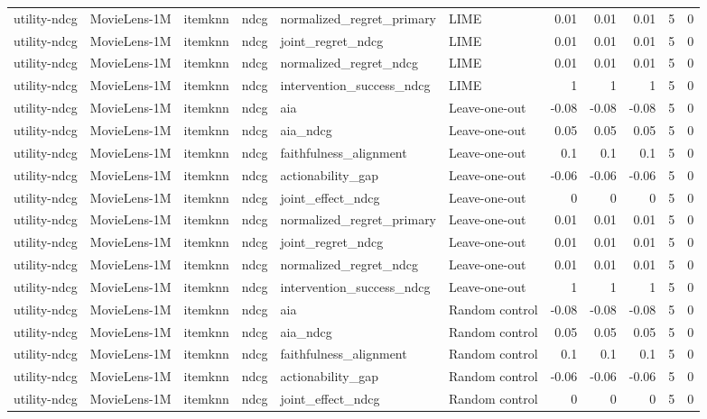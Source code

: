 \begin{table}[t]
{\begin{tabular}{llllllrrrrr}
utility-ndcg & MovieLens-1M & itemknn & ndcg & normalized\_regret\_primary & LIME & 0.01 & 0.01 & 0.01 & 5 & 0 \\
utility-ndcg & MovieLens-1M & itemknn & ndcg & joint\_regret\_ndcg & LIME & 0.01 & 0.01 & 0.01 & 5 & 0 \\
utility-ndcg & MovieLens-1M & itemknn & ndcg & normalized\_regret\_ndcg & LIME & 0.01 & 0.01 & 0.01 & 5 & 0 \\
utility-ndcg & MovieLens-1M & itemknn & ndcg & intervention\_success\_ndcg & LIME & 1 & 1 & 1 & 5 & 0 \\
utility-ndcg & MovieLens-1M & itemknn & ndcg & aia & Leave-one-out & -0.08 & -0.08 & -0.08 & 5 & 0 \\
utility-ndcg & MovieLens-1M & itemknn & ndcg & aia\_ndcg & Leave-one-out & 0.05 & 0.05 & 0.05 & 5 & 0 \\
utility-ndcg & MovieLens-1M & itemknn & ndcg & faithfulness\_alignment & Leave-one-out & 0.1 & 0.1 & 0.1 & 5 & 0 \\
utility-ndcg & MovieLens-1M & itemknn & ndcg & actionability\_gap & Leave-one-out & -0.06 & -0.06 & -0.06 & 5 & 0 \\
utility-ndcg & MovieLens-1M & itemknn & ndcg & joint\_effect\_ndcg & Leave-one-out & 0 & 0 & 0 & 5 & 0 \\
utility-ndcg & MovieLens-1M & itemknn & ndcg & normalized\_regret\_primary & Leave-one-out & 0.01 & 0.01 & 0.01 & 5 & 0 \\
utility-ndcg & MovieLens-1M & itemknn & ndcg & joint\_regret\_ndcg & Leave-one-out & 0.01 & 0.01 & 0.01 & 5 & 0 \\
utility-ndcg & MovieLens-1M & itemknn & ndcg & normalized\_regret\_ndcg & Leave-one-out & 0.01 & 0.01 & 0.01 & 5 & 0 \\
utility-ndcg & MovieLens-1M & itemknn & ndcg & intervention\_success\_ndcg & Leave-one-out & 1 & 1 & 1 & 5 & 0 \\
utility-ndcg & MovieLens-1M & itemknn & ndcg & aia & Random control & -0.08 & -0.08 & -0.08 & 5 & 0 \\
utility-ndcg & MovieLens-1M & itemknn & ndcg & aia\_ndcg & Random control & 0.05 & 0.05 & 0.05 & 5 & 0 \\
utility-ndcg & MovieLens-1M & itemknn & ndcg & faithfulness\_alignment & Random control & 0.1 & 0.1 & 0.1 & 5 & 0 \\
utility-ndcg & MovieLens-1M & itemknn & ndcg & actionability\_gap & Random control & -0.06 & -0.06 & -0.06 & 5 & 0 \\
utility-ndcg & MovieLens-1M & itemknn & ndcg & joint\_effect\_ndcg & Random control & 0 & 0 & 0 & 5 & 0 \\

\end{tabular}}
\end{table}
